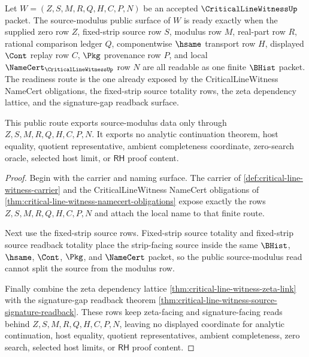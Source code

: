 \begin{theorem}
\label{thm:critical-line-witness-source-modulus-public-readiness}
Let $W=(Z,S,M,R,Q,H,C,P,N)$ be an accepted $\CriticalLineWitnessUp$ packet. The source-modulus public surface of $W$ is ready exactly when the supplied zero row $Z$, fixed-strip source row $S$, modulus row $M$, real-part row $R$, rational comparison ledger $Q$, componentwise $\hsame$ transport row $H$, displayed $\Cont$ replay row $C$, $\Pkg$ provenance row $P$, and local $\NameCert_{\CriticalLineWitnessUp}$ row $N$ are all readable as one finite $\BHist$ packet. The readiness route is the one already exposed by the CriticalLineWitness NameCert obligations, the fixed-strip source totality rows, the zeta dependency lattice, and the signature-gap readback surface.

This public route exports source-modulus data only through $Z,S,M,R,Q,H,C,P,N$. It exports no analytic continuation theorem, host equality, quotient representative, ambient completeness coordinate, zero-search oracle, selected host limit, or $\mathsf{RH}$ proof content.
\end{theorem}
\begin{proof}
Begin with the carrier and naming surface. The carrier of \autoref{def:critical-line-witness-carrier} and the CriticalLineWitness NameCert obligations of \autoref{thm:critical-line-witness-namecert-obligations} expose exactly the rows $Z,S,M,R,Q,H,C,P,N$ and attach the local name to that finite route.

Next use the fixed-strip source rows. Fixed-strip source totality and fixed-strip source readback totality place the strip-facing source inside the same $\BHist$, $\hsame$, $\Cont$, $\Pkg$, and $\NameCert$ packet, so the public source-modulus read cannot split the source from the modulus row.

Finally combine the zeta dependency lattice \autoref{thm:critical-line-witness-zeta-link} with the signature-gap readback theorem \autoref{thm:critical-line-witness-source-signature-readback}. These rows keep zeta-facing and signature-facing reads behind $Z,S,M,R,Q,H,C,P,N$, leaving no displayed coordinate for analytic continuation, host equality, quotient representatives, ambient completeness, zero search, selected host limits, or $\mathsf{RH}$ proof content.
\end{proof}


